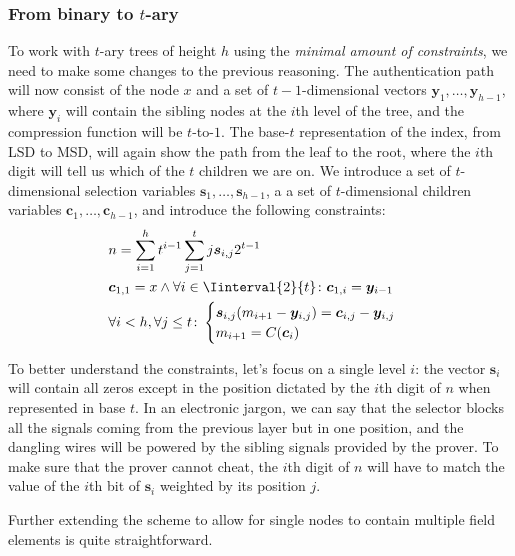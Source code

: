 \subsubsection*{From binary to \(t\)-ary}
To work with \(t\)-ary trees of height \(h\) using the \emph{minimal amount of constraints}, we 
need to make some changes to the previous reasoning.
The authentication path will now consist of the node \(x\) and a set of \(t-1\)-dimensional 
vectors \(\bm{y}_1, \dots, \bm{y}_{h-1}\), where \(\bm{y}_i\) will contain the sibling nodes at 
the \(i\)th level of the tree, and the compression function will be \(t\)-to-\(1\).
The base-\(t\) representation of the index, from LSD to MSD, will again show the path from the leaf 
to the root, where the \(i\)th digit will tell us which of the \(t\) children we are on.
We introduce a set of \(t\)-dimensional selection variables \(\bm{s}_1, \dots, \bm{s}_{h-1}\), a
a set of \(t\)-dimensional children variables \(\bm{c}_1, \dots, \bm{c}_{h-1}\), and introduce 
the following constraints:
\begin{align*}
  & n = \sum_{i=1}^{h}{t^{i-1}\sum_{j=1}^{t}{j\bm{s}_{i,j}2^{t-1}}} \\
  & \bm{c}_{1,1} = x \land \forall i \in \Iinterval{2}{t}\colon \bm{c}_{1,i} = \bm{y}_{i-1} \\
  & \forall i < h, \forall j \le t\colon 
  \begin{cases}
    \bm{s}_{i,j}\Parens*{m_{i+1} - \bm{y}_{i,j}} = \bm{c}_{i,j} - \bm{y}_{i,j} \\
    m_{i+1} = \call{C}{\bm{c}_i}
  \end{cases}
\end{align*}

To better understand the constraints, let's focus on a single level \(i\): the vector 
\(\bm{s}_i\) will contain all zeros except in the position dictated by the \(i\)th digit of 
\(n\) when represented in base \(t\). 
In an electronic jargon, we can say that the selector blocks all the signals coming from the 
previous layer but in one position, and the dangling wires will be powered by the sibling signals 
provided by the prover.
To make sure that the prover cannot cheat, the \(i\)th digit of \(n\) will have to match the 
value of the \(i\)th bit of \(\bm{s}_i\) weighted by its position \(j\).

Further extending the scheme to allow for single nodes to contain multiple field elements is 
quite straightforward.

